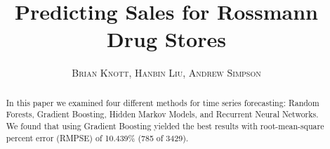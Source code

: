 \documentclass[twoside]{article}
\title{\vspace{-15mm}\fontsize{24pt}{10pt}\selectfont\textbf{Predicting Sales for Rossmann Drug Stores}} %
\author{
\large
\textsc{Brian Knott, Hanbin Liu, Andrew Simpson}\\[2mm] %
\vspace{-5cm}
}
\date{}
\begin{document}
\maketitle %

\thispagestyle{fancy} %

\vspace{-1cm}
\begin{abstract}

\noindent In this paper we examined four different methods for time series forecasting: Random Forests, Gradient Boosting, Hidden Markov Models, and Recurrent Neural Networks. We found that using Gradient Boosting yielded the best results with root-mean-square percent error (RMPSE) of 10.439\% (785 of 3429). 

\end{abstract}

\end{document}
